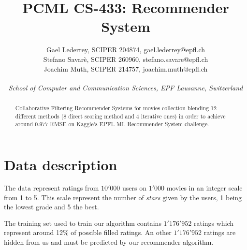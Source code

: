 \documentclass[10pt,conference,compsocconf]{IEEEtran}
\begin{document}
\title{PCML CS-433: Recommender System}

\author{
  Gael Lederrey, SCIPER 204874, gael.lederrey@epfl.ch \\
  Stefano Savar\`e, SCIPER 260960, stefano.savare@epfl.ch \\
  Joachim Muth, SCIPER 214757, joachim.muth@epfl.ch\\ \\
  \textit{School of Computer and Communication Sciences, EPF Lausanne, Switzerland}
}

\maketitle

\begin{abstract}
Collaborative Filtering Recommender Systems for movies collection blending 12 different methods (8 direct scoring method and 4 iterative ones) in order to achieve around 0.977 RMSE on Kaggle's EPFL ML Recommender System challenge. 
\end{abstract}

\section{Data description}

The data represent ratings from $10'000$ users on $1'000$ movies in an integer scale from 1 to 5. This scale represent the number of \textit{stars} given by the users, 1 being the lowest grade and 5 the best.

The training set used to train our algorithm contains $1'176'952$ ratings which represent around 12\% of possible filled ratings. 
An other $1'176'952$ ratings are hidden from us and must be predicted by our recommender algorithm.


\end{document}
